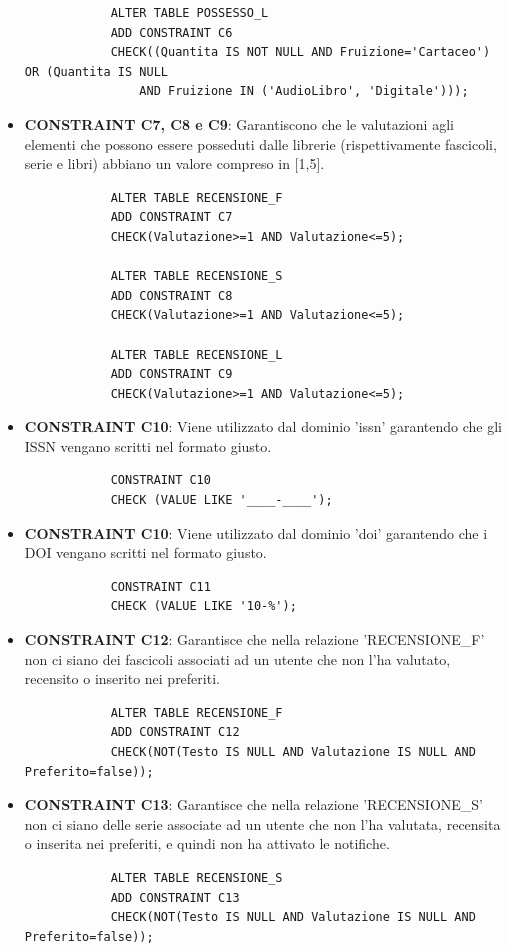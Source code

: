 \documentclass{article}
\begin{document}
\begin{itemize}
\begin{verbatim}
            ALTER TABLE POSSESSO_L
            ADD CONSTRAINT C6
            CHECK((Quantita IS NOT NULL AND Fruizione='Cartaceo') OR (Quantita IS NULL 
                AND Fruizione IN ('AudioLibro', 'Digitale')));
        \end{verbatim} 

        \item \textbf{CONSTRAINT C7, C8 e C9}: Garantiscono che le valutazioni agli elementi che possono essere posseduti dalle librerie (rispettivamente fascicoli, serie e libri) abbiano un valore compreso in [1,5].
        \newpage
        \begin{verbatim}
            ALTER TABLE RECENSIONE_F
            ADD CONSTRAINT C7
            CHECK(Valutazione>=1 AND Valutazione<=5); 

            ALTER TABLE RECENSIONE_S
            ADD CONSTRAINT C8
            CHECK(Valutazione>=1 AND Valutazione<=5);

            ALTER TABLE RECENSIONE_L
            ADD CONSTRAINT C9
            CHECK(Valutazione>=1 AND Valutazione<=5);
        \end{verbatim} 

        \item \textbf{CONSTRAINT C10}: Viene utilizzato dal dominio 'issn' garantendo che gli ISSN vengano scritti nel formato giusto.
        \begin{verbatim}
            CONSTRAINT C10
            CHECK (VALUE LIKE '____-____');
        \end{verbatim}

        \item \textbf{CONSTRAINT C10}: Viene utilizzato dal dominio 'doi' garantendo che i DOI vengano scritti nel formato giusto.
        \begin{verbatim}
            CONSTRAINT C11
            CHECK (VALUE LIKE '10-%');
        \end{verbatim}

        \item \textbf{CONSTRAINT C12}: Garantisce che nella relazione 'RECENSIONE\_F' non ci siano dei fascicoli associati ad un utente che non l'ha valutato, recensito o inserito nei preferiti.
        \begin{verbatim}
            ALTER TABLE RECENSIONE_F
            ADD CONSTRAINT C12
            CHECK(NOT(Testo IS NULL AND Valutazione IS NULL AND Preferito=false));
        \end{verbatim}

        \item \textbf{CONSTRAINT C13}: Garantisce che nella relazione 'RECENSIONE\_S' non ci siano delle serie associate ad un utente che non l'ha valutata, recensita o inserita nei preferiti, e quindi non ha attivato le notifiche.
        \begin{verbatim}
            ALTER TABLE RECENSIONE_S
            ADD CONSTRAINT C13
            CHECK(NOT(Testo IS NULL AND Valutazione IS NULL AND Preferito=false));
        \end{verbatim}


\end{itemize}
\end{document}
